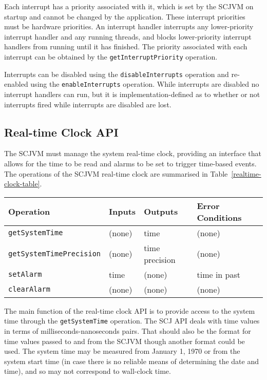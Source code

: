 \documentclass[a4paper,10pt]{report}
\begin{document}
Each interrupt has a priority associated with it, which is set by the
SCJVM on startup and cannot be changed by the application.
These interrupt priorities must be hardware priorities.
An interrupt handler interrupts any lower-priority interrupt handler
and any running threads, and blocks lower-priority interrupt handlers
from running until it has finished.
The priority associated with each interrupt can be obtained by the
\texttt{get\-Interrupt\-Priority} operation.

Interrupts can be disabled using the \texttt{disable\-Interrupts}
operation and re-enabled using the \texttt{enable\-Interrupts}
operation.
While interrupts are disabled no interrupt handlers can run, but it is
implementation-defined as to whether or not interrupts fired while
interrupts are disabled are lost.

\subsection{Real-time Clock API}
\label{realtime-clock-section}

The SCJVM must manage the system real-time clock, providing an
interface that allows for the time to be read and alarms to be set to
trigger time-based events.
The operations of the SCJVM real-time clock are summarised in
Table~\ref{realtime-clock-table}.

\begin{table*}[ht]
  \centering
  \footnotesize
  \begin{tabular}{|l|p{1.2cm}|p{2cm}|p{2.6cm}|}
    Operation & Inputs & Outputs & Error Conditions \\
    \hline
    \texttt{getSystemTime} &
    (none) &
    time &
    (none)
    \\\texttt{getSystemTimePrecision} &
    (none) &
    time precision &
    (none)
    \\\texttt{setAlarm} &
    time &
    (none) &
    time in past
    \\\texttt{clearAlarm} &
    (none) &
    (none) &
    (none)
  \end{tabular}
  \caption{The operations of the SCJVM real-time clock}
  \label{realtime-clock-table}
\end{table*}

The main function of the real-time clock API is to provide access to
the system time through the \texttt{get\-System\-Time} operation.
The SCJ API deals with time values in terms of
milliseconds-nanoseconds pairs.
That should also be the format for time values passed to and from the
SCJVM though another format could be used.
The system time may be measured from January 1, 1970 or from the
system start time (in case there is no reliable means of determining
the date and time), and so may not correspond to wall-clock time.
\end{document}
